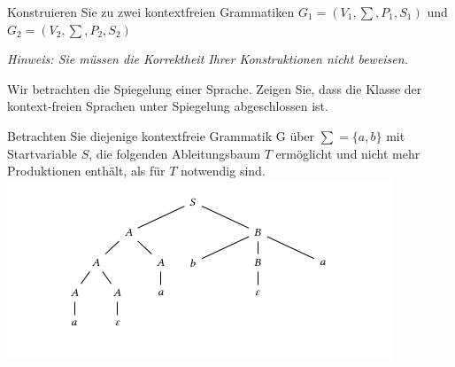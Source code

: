\documentclass[10pt, a4paper]{exam}
\begin{document}
\begin{questions}
    \question Konstruieren Sie zu zwei kontextfreien Grammatiken $G_1 = (V_1 , \sum, P_1 , S_1 )$ und $G_2 = (V_2 , \sum, P_2 , S_2 )$

    \textit{Hinweis: Sie müssen die Korrektheit Ihrer Konstruktionen nicht beweisen.}

    \question Wir betrachten die Spiegelung einer Sprache. Zeigen Sie, dass die Klasse der kontext-freien Sprachen unter Spiegelung abgeschlossen ist.
    \begin{solution}
    \end{solution}

    \question Betrachten Sie diejenige kontextfreie Grammatik G über $\sum = \{a, b\}$ mit Startvariable $S$, die folgenden Ableitungsbaum $T$ ermöglicht und nicht mehr Produktionen enthält, als für $T$ notwendig sind.
    \includegraphics{Assets/ASK_uebung/u06_01.png}
    \begin{parts}

\end{parts}
\end{questions}
\end{document}
